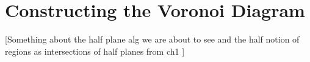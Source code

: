 \documentclass[12pt,twoside]{reedthesis}
\begin{document}
  
  




  \chapter*{Constructing the Voronoi Diagram}
    \setcounter{chapter}{2}
    \setcounter{section}{0}
    [Something about the half plane alg we are about to see and the half notion of regions as intersections of half planes from ch1 ]
\end{document}
